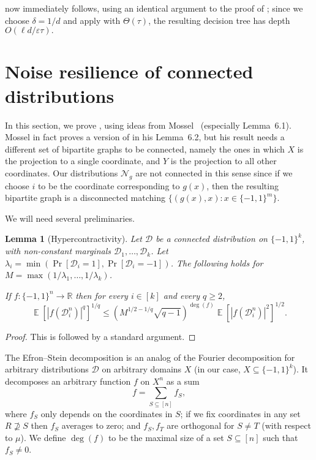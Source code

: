 \documentclass{article}
\newtheorem{lemma}[theorem]{Lemma}
\theoremstyle{definition}
\theoremstyle{remark}
\DeclareMathOperator*{\E}{\mathbb{E}}
\providecommand{\normal}{\mathcal{N}}
\providecommand{\normalg}[1]{\normal_{#1}}
\newcommand\eps{\varepsilon}
\renewcommand\epsilon{\eps}
\renewcommand\geq{\geqslant}
\renewcommand\leq{\leqslant}
\begin{document}
 now immediately follows, using an identical argument to the proof of ; since we choose $\delta = 1/d$ and apply  with $\Theta(\tau)$, the resulting decision tree has depth $O(\ell d/\epsilon\tau).$

\section{Noise resilience of connected distributions}
\label{apx:connected}

In this section, we prove , using ideas from Mossel~\cite{Mossel2010} (especially Lemma~6.1).
Mossel in fact proves a version of  in his Lemma~6.2, but his result needs a different set of bipartite graphs to be connected, namely the ones in which $X$ is the projection to a single coordinate, and $Y$ is the projection to all other coordinates. Our distributions $\normalg{g}$ are not connected in this sense since if we choose $i$ to be the coordinate corresponding to $g(x)$, then the resulting bipartite graph is a disconnected matching $\{ (g(x),x) : x \in \{-1,1\}^m \}$. 

We will need several preliminaries.

\begin{lemma}[Hypercontractivity] \label{lem:hypercontractivity}
Let $\mathcal{D}$ be a connected distribution on $\{-1,1\}^k$, with non-constant marginals $\mathcal{D}_1,\ldots,\mathcal{D}_k$. Let $\lambda_i = \min(\Pr[\mathcal{D}_i = 1], \Pr[\mathcal{D}_i = -1])$. The following holds for $M = \max(1/\lambda_1,\ldots,1/\lambda_k)$.

If $f\colon \{-1,1\}^n \to \mathbb{R}$ then for every $i \in [k]$ and every $q \geq 2$,
\[
 \E[|f(\mathcal{D}_i^n)|^q]^{1/q} \leq \left(M^{1/2-1/q} \sqrt{q-1}\right)^{\deg(f)} \E[|f(\mathcal{D}_i^n)|^2]^{1/2}.
\]
\end{lemma}
\begin{proof}
This is \cite[Corollary 10.20]{ODonnell} followed by a standard argument.
\end{proof}

The Efron--Stein decomposition is an analog of the Fourier decomposition for arbitrary distributions $\mathcal{D}$ on arbitrary domains $X$ (in our case, $X \subseteq \{-1,1\}^k$). It decomposes an arbitrary function $f$ on $X^n$ as a sum
\[
 f = \sum_{S \subseteq [n]} f_S,
\]
where $f_S$ only depends on the coordinates in $S$; if we fix coordinates in any set $R \not\supseteq S$ then $f_S$ averages to zero; and $f_S,f_T$ are orthogonal for $S \neq T$ (with respect to $\mu$). We define $\deg(f)$ to be the maximal size of a set $S \subseteq [n]$ such that $f_S \neq 0$.
\end{document}
